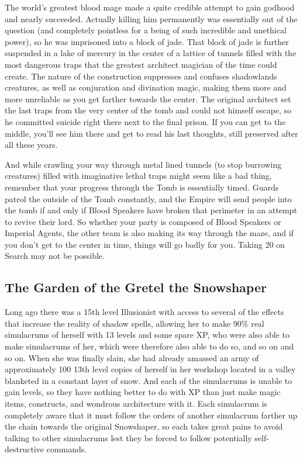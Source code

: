 The world's greatest blood mage made a quite credible attempt to gain godhood and nearly succeeded. Actually killing him permanently was essentially out of the question (and completely pointless for a being of such incredible and unethical power), so he was imprisoned into a block of jade. That block of jade is further suspended in a lake of mercury in the center of a lattice of tunnels filled with the most dangerous traps that the greatest architect magician of the time could create. The nature of the construction suppresses and confuses shadowlands creatures, as well as conjuration and divination magic, making them more and more unreliable as you get farther towards the center. The original architect set the last traps from the very center of the tomb and could not himself escape, so he committed suicide right there next to the final prison. If you can get to the middle, you'll see him there and get to read his last thoughts, still preserved after all these years.

And while crawling your way through metal lined tunnels (to stop burrowing creatures) filled with imaginative lethal traps might seem like a bad thing, remember that your progress through the Tomb is essentially timed. Guards patrol the outside of the Tomb constantly, and the Empire will send people into the tomb if and only if Blood Speakers have broken that perimeter in an attempt to revive their lord. So whether your party is composed of Blood Speakers or Imperial Agents, the other team is also making its way through the maze, and if you don't get to the center in time, things will go badly for you. Taking 20 on Search may not be possible.

\subsection{The Garden of the Gretel the Snowshaper}

Long ago there was a 15th level Illusionist with access to several of the effects that increase the reality of shadow spells, allowing her to make 90\% real simulacrums of herself with 13 levels and some spare XP, who were also able to make simulacrums of her, which were therefore also able to do so, and so on and so on. When she was finally slain, she had already amassed an army of approximately 100 13th level copies of herself in her workshop located in a valley blanketed in a constant layer of snow. And each of the simulacrums is unable to gain levels, so they have nothing better to do with XP than just make magic items, constructs, and wondrous architecture with it. Each simulacrum is completely aware that it must follow the orders of another simulacrum farther up the chain towards the original Snowshaper, so each takes great pains to avoid talking to other simulacrums lest they be forced to follow potentially self-destructive commands.

